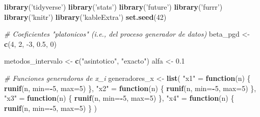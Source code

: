 \documentclass[]{article}
\newenvironment{Shaded}{\begin{snugshade}}{\end{snugshade}}
\newcommand{\CommentTok}[1]{\textcolor[rgb]{0.56,0.35,0.01}{\textit{#1}}}
\newcommand{\ControlFlowTok}[1]{\textcolor[rgb]{0.13,0.29,0.53}{\textbf{#1}}}
\newcommand{\DataTypeTok}[1]{\textcolor[rgb]{0.13,0.29,0.53}{#1}}
\newcommand{\DecValTok}[1]{\textcolor[rgb]{0.00,0.00,0.81}{#1}}
\newcommand{\FloatTok}[1]{\textcolor[rgb]{0.00,0.00,0.81}{#1}}
\newcommand{\KeywordTok}[1]{\textcolor[rgb]{0.13,0.29,0.53}{\textbf{#1}}}
\newcommand{\NormalTok}[1]{#1}
\newcommand{\OperatorTok}[1]{\textcolor[rgb]{0.81,0.36,0.00}{\textbf{#1}}}
\newcommand{\StringTok}[1]{\textcolor[rgb]{0.31,0.60,0.02}{#1}}
\begin{document}
\begin{Shaded}
\begin{Highlighting}[]
\KeywordTok{library}\NormalTok{(}\StringTok{'tidyverse'}\NormalTok{)}
\KeywordTok{library}\NormalTok{(}\StringTok{'stats'}\NormalTok{)}
\KeywordTok{library}\NormalTok{(}\StringTok{'future'}\NormalTok{)}
\KeywordTok{library}\NormalTok{(}\StringTok{'furrr'}\NormalTok{)}
\KeywordTok{library}\NormalTok{(}\StringTok{'knitr'}\NormalTok{)}
\KeywordTok{library}\NormalTok{(}\StringTok{'kableExtra'}\NormalTok{)}
\KeywordTok{set.seed}\NormalTok{(}\DecValTok{42}\NormalTok{)}

\CommentTok{# Coeficientes "platonicos" (i.e., del proceso generador de datos)}
\NormalTok{beta_pgd <-}\StringTok{ }\KeywordTok{c}\NormalTok{(}\DecValTok{4}\NormalTok{, }\DecValTok{2}\NormalTok{, }\DecValTok{-3}\NormalTok{, }\FloatTok{0.5}\NormalTok{, }\DecValTok{0}\NormalTok{)}

\NormalTok{metodos_intervalo <-}\StringTok{ }\KeywordTok{c}\NormalTok{(}\StringTok{"asintotico"}\NormalTok{, }\StringTok{"exacto"}\NormalTok{)}
\NormalTok{alfa <-}\StringTok{ }\FloatTok{0.1}

\CommentTok{# Funciones generadoras de x_i}
\NormalTok{generadores_x <-}\StringTok{ }\KeywordTok{list}\NormalTok{(}
    \StringTok{"x1"}\NormalTok{ =}\StringTok{ }\ControlFlowTok{function}\NormalTok{(n) \{ }\KeywordTok{runif}\NormalTok{(n, }\DataTypeTok{min=}\OperatorTok{-}\DecValTok{5}\NormalTok{, }\DataTypeTok{max=}\DecValTok{5}\NormalTok{) \},}
    \StringTok{"x2"}\NormalTok{ =}\StringTok{ }\ControlFlowTok{function}\NormalTok{(n) \{ }\KeywordTok{runif}\NormalTok{(n, }\DataTypeTok{min=}\OperatorTok{-}\DecValTok{5}\NormalTok{, }\DataTypeTok{max=}\DecValTok{5}\NormalTok{) \},}
    \StringTok{"x3"}\NormalTok{ =}\StringTok{ }\ControlFlowTok{function}\NormalTok{(n) \{ }\KeywordTok{runif}\NormalTok{(n, }\DataTypeTok{min=}\OperatorTok{-}\DecValTok{5}\NormalTok{, }\DataTypeTok{max=}\DecValTok{5}\NormalTok{) \},}
    \StringTok{"x4"}\NormalTok{ =}\StringTok{ }\ControlFlowTok{function}\NormalTok{(n) \{ }\KeywordTok{runif}\NormalTok{(n, }\DataTypeTok{min=}\OperatorTok{-}\DecValTok{5}\NormalTok{, }\DataTypeTok{max=}\DecValTok{5}\NormalTok{) \}}
\NormalTok{)}


\end{Highlighting}
\end{Shaded}
\end{document}
